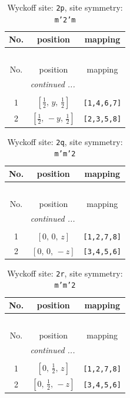 \documentclass[fleqn,8pt]{jsarticle}
\begin{document}
\begin{longtable}{ccc}
\caption{Wyckoff site: {\tt 2p}, site symmetry: {\tt m'2'm}}
 \\
 \hline \hline
No. & position & mapping \\ \hline \endfirsthead

\multicolumn{2}{l}{\tablename\ \thetable{}} \\
 \hline \hline
No. & position & mapping \\ \hline \endhead

 \hline \hline
\multicolumn{2}{r}{\footnotesize\it continued ...} \\ \endfoot

 \hline \hline
\multicolumn{2}{r}{} \\ \endlastfoot

1 & $\left[ \frac{1}{2},\, y,\, \frac{1}{2} \right]$ & {\tt [1,4,6,7]} \\ \hline
2 & $\left[ \frac{1}{2},\, - y,\, \frac{1}{2} \right]$ & {\tt [2,3,5,8]} \\
\end{longtable}
\renewcommand{\arraystretch}{1.2}
\begin{longtable}{ccc}
\caption{Wyckoff site: {\tt 2q}, site symmetry: {\tt m'm'2}}
 \\
 \hline \hline
No. & position & mapping \\ \hline \endfirsthead

\multicolumn{2}{l}{\tablename\ \thetable{}} \\
 \hline \hline
No. & position & mapping \\ \hline \endhead

 \hline \hline
\multicolumn{2}{r}{\footnotesize\it continued ...} \\ \endfoot

 \hline \hline
\multicolumn{2}{r}{} \\ \endlastfoot

1 & $\left[ 0,\, 0,\, z \right]$ & {\tt [1,2,7,8]} \\ \hline
2 & $\left[ 0,\, 0,\, - z \right]$ & {\tt [3,4,5,6]} \\
\end{longtable}
\renewcommand{\arraystretch}{1.2}
\begin{longtable}{ccc}
\caption{Wyckoff site: {\tt 2r}, site symmetry: {\tt m'm'2}}
 \\
 \hline \hline
No. & position & mapping \\ \hline \endfirsthead

\multicolumn{2}{l}{\tablename\ \thetable{}} \\
 \hline \hline
No. & position & mapping \\ \hline \endhead

 \hline \hline
\multicolumn{2}{r}{\footnotesize\it continued ...} \\ \endfoot

 \hline \hline
\multicolumn{2}{r}{} \\ \endlastfoot

1 & $\left[ 0,\, \frac{1}{2},\, z \right]$ & {\tt [1,2,7,8]} \\ \hline
2 & $\left[ 0,\, \frac{1}{2},\, - z \right]$ & {\tt [3,4,5,6]} \\
\end{longtable}
\end{document}
